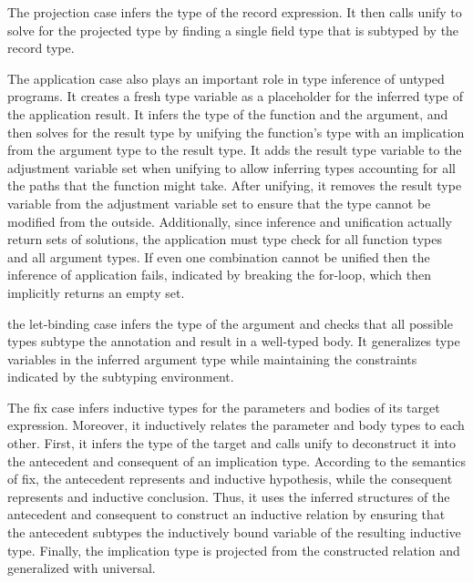 \documentclass[acmsmall]{acmart}
\theoremstyle{definition}
\begin{document}
The projection case infers the type of the record expression. 
It then calls unify to solve for the projected type by finding
a single field type that is subtyped by the record type. 

The application case also plays an important role in type inference of untyped programs.
It creates a fresh type variable as a placeholder for the inferred type of the application result.
It infers the type of the function and the argument, and then solves for the result type
by unifying the function's type with an implication from the argument type to the result type.
It adds the result type variable to the adjustment variable set when unifying to allow inferring 
types accounting for all the paths that the function might take.
After unifying, it removes the result type variable from the adjustment variable set to ensure
that the type cannot be modified from the outside.
Additionally, since inference and unification actually return sets of solutions,
the application must type check for all function types and all argument types.
If even one combination cannot be unified then the inference of application fails,
indicated by breaking the for-loop, which then implicitly returns an empty set.  


the let-binding case infers the type of the argument and checks that
all possible types subtype the annotation and result in a well-typed body. 
It generalizes type variables in the inferred argument type while maintaining
the constraints indicated by the subtyping environment. 



The fix case infers inductive types for the parameters and bodies of its
target expression. Moreover, it inductively relates the parameter and body types to each other.
First, it infers the type of the target and calls unify to deconstruct it into the antecedent
and consequent of an implication type. According to the semantics of fix, the antecedent
represents and inductive hypothesis, while the consequent represents and inductive conclusion.
Thus, it uses the inferred structures of the antecedent and consequent to construct an 
inductive relation by ensuring that the antecedent subtypes the inductively bound variable of 
the resulting inductive type.
Finally, the implication type is projected from the constructed relation and generalized with universal.
\end{document}
